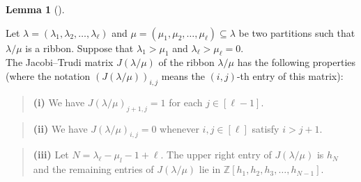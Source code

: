 \documentclass[numbers=enddot,12pt,final,onecolumn,notitlepage]{scrartcl}%
\theoremstyle{definition}
\newtheorem{lem}[theo]{Lemma}
\newenvironment{lemma}[1][]
{\begin{lem}[#1]\begin{leftbar}}
{\end{leftbar}\end{lem}}
\newtheorem{defi}[theo]{Definition}
\newenvironment{definition}[1][]
{\begin{defi}[#1]\begin{leftbar}}
{\end{leftbar}\end{defi}}
\newtheorem{exam}[theo]{Example}
\newenvironment{example}[1][]
{\begin{exam}[#1]\begin{leftbar}}
{\end{leftbar}\end{exam}}
\newenvironment{statement}{\begin{quote}}{\end{quote}}
\newcommand{\tup}[1]{\left( #1 \right)}
\renewcommand{\leq}{\leqslant}
\theoremstyle{plainsl}
\begin{document}









\begin{lemma}
\label{lemma.Hessenberg}
Let $\lambda= (\lambda_1, \lambda_2, \ldots, \lambda_{\ell})$  and $\mu= (\mu_1, \mu_2, \ldots, \mu_{\ell}) \subseteq \lambda$ be two partitions such that $\lambda/\mu$ is a ribbon.
Suppose that $\lambda_1> \mu_1$ and $\lambda_\ell > \mu_\ell = 0$.\\

The Jacobi--Trudi matrix $J(\lambda/\mu)$ of the ribbon $\lambda/\mu$ has the following properties
(where the notation $\tup{J(\lambda/\mu)}_{i,j}$ means the $\tup{i,j}$-th entry of this matrix):

\begin{statement}
\textbf{(i)} We have $J(\lambda/\mu)_{j+1,j}=1$ for each $j \in [\ell-1]$.
\end{statement}

\begin{statement}
\textbf{(ii)} We have $J(\lambda/\mu)_{i,j}=0$ whenever
$i, j \in [\ell]$ satisfy $i > j+1$.
\end{statement}

\begin{statement}
\textbf{(iii)} Let $N= \lambda_\ell -\mu_l-1+\ell$. The upper right entry of $J(\lambda/\mu)$ is $h_N$ and the remaining entries of $J(\lambda/\mu)$ lie in $\mathbb{Z}\left[  h_{1},h_{2},h_{3},\ldots, h_{N-1}\right]$.
\end{statement}
\end{lemma}
\end{document}
